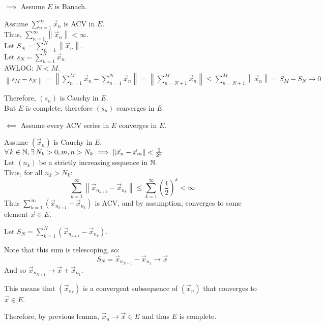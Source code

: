\documentclass[letterpaper,12pt,fleqn]{article}
\newcommand{\norm}[1]{\left\|#1\right\|}
\newcommand{\vx}{\vec{x}}
\begin{document}
\begin{theproof}
  \listbreak
  \begin{description}
  \item $\implies$ Assume $E$ is Banach.

    Assume $\sum_{n=1}^{\infty}\vx_n$ is ACV in $E$. \\
    Thus, $\sum_{n=1}^{\infty}\norm{\vx_n}<\infty$. \\
    Let $S_N=\sum_{n=1}^N\norm{\vx_n}$. \\
    Let $s_N=\sum_{n=1}^N\vx_n$. \\
    AWLOG: $N<M$. \\
    $\norm{s_M-s_N}=\norm{\sum_{n=1}^M\vx_n-\sum_{n=1}^N\vx_n}=
    \norm{\sum_{n=N+1}^M\vx_n}\le\sum_{n=N+1}^M\norm{\vx_n}=S_M-S_N\to0$

    Therefore, $(s_n)$ is Cauchy in $E$. \\
    But $E$ is complete, therefore $(s_n)$ converges in $E$.

  \item $\impliedby$ Assume every ACV series in $E$ converges in $E$.

    Assume $(\vx_n)$ is Cauchy in $E$. \\
    $\forall\,k\in\N,\exists\,N_k>0,m,n>N_k\implies\norm{\vx_n-\vx_m}<
    \frac{1}{2^k}$ \\
    Let $(n_k)$ be a strictly increasing sequence in $\mathbb{N}$. \\
    Thus, for all $n_k>N_k$:
    \[\sum_{k=1}^{\infty}\norm{\vx_{n_{k+1}}-\vx_{n_k}}\le
    \sum_{k=1}^{\infty}\left(\frac{1}{2}\right)^k<\infty\]
    Thus $\sum_{k=1}^{\infty}(\vx_{n_{k+1}}-\vx_{n_k})$ is ACV, and by assumption,
    converges to some element $\vx\in E$.

    Let $S_N=\sum_{k=1}^N(\vx_{n_{k+1}}-\vx_{n_k})$.
    
    Note that this sum is telescoping, so:
    \[S_N=\vx_{n_{N+1}}-\vx_{n_1}\to\vx\]
    And so $\vx_{n_{N+1}}\to\vx+\vx_{n_1}$.
    
    This means that $(\vx_{n_k})$ is a convergent subsequence of $(\vx_n)$
    that converges to $\vx\in E$.

    Therefore, by previous lemma, $\vx_n\to\vx\in E$ and thus $E$ is complete.
  \end{description}
\end{theproof}
\end{document}
